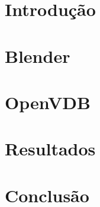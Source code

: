 \documentclass[12pt, a4paper, oneside]{book}
\begin{document}
\frontmatter
%
 

\tableofcontents

\chapter{Introdução}



\chapter{Blender}



\chapter{OpenVDB}
\label{data_struct}



\chapter{Resultados}

%

\chapter{Conclusão}

%

\iffalse
1. introdução (4)
 1.1 definição do problema / objetivo
 1.2 motivação
 1.3 sobre o projeto pessoal

2. estrutura de dados (10)
 2.1 definição
 2.2 relação com outras estruturas

3. blender (10)
 3.1 textura 
  3.1.1 definição
  3.1.2 mapeamento
  3.1.3 tiles
  3.1.4 3d
 3.2 sistemas de coordenadas
  3.2.1 WCS
  3.2.2 ObjSpace
  3.2.3 coordenadas da textura, mapeamento uv
3.3 shaders / OSL
 3.3.1 interface com estruturas / textura

4. resultados (5)
 4.1 imagens
 4.2 referências à teoria
 4.3 tempo / benchmark

5. conclusão
 5.1 desafios encontrados
 5.2 análise resultados
 5.3 ganhos pessoais / disciplinas / projetos 

\fi
\end{document}
